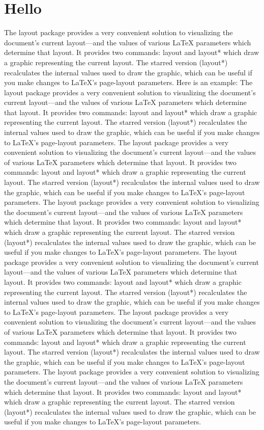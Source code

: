 \documentclass{bduMasters}
\begin{document}
\section{Hello}
The layout package provides a very convenient solution to visualizing the document's current layout—and the values of various LaTeX parameters which determine that layout. It provides two commands: layout and layout* which draw a graphic representing the current layout. The starred version (layout*) recalculates the internal values used to draw the graphic, which can be useful if you make changes to LaTeX's page-layout parameters. Here is an example:
The layout package provides a very convenient solution to visualizing the document's current layout—and the values of various LaTeX parameters which determine that layout. It provides two commands: layout and layout* which draw a graphic representing the current layout. The starred version (layout*) recalculates the internal values used to draw the graphic, which can be useful if you make changes to LaTeX's page-layout parameters.
The layout package provides a very convenient solution to visualizing the document's current layout—and the values of various LaTeX parameters which determine that layout. It provides two commands: layout and layout* which draw a graphic representing the current layout. The starred version (layout*) recalculates the internal values used to draw the graphic, which can be useful if you make changes to LaTeX's page-layout parameters.
The layout package provides a very convenient solution to visualizing the document's current layout—and the values of various LaTeX parameters which determine that layout. It provides two commands: layout and layout* which draw a graphic representing the current layout. The starred version (layout*) recalculates the internal values used to draw the graphic, which can be useful if you make changes to LaTeX's page-layout parameters.
The layout package provides a very convenient solution to visualizing the document's current layout—and the values of various LaTeX parameters which determine that layout. It provides two commands: layout and layout* which draw a graphic representing the current layout. The starred version (layout*) recalculates the internal values used to draw the graphic, which can be useful if you make changes to LaTeX's page-layout parameters.
The layout package provides a very convenient solution to visualizing the document's current layout—and the values of various LaTeX parameters which determine that layout. It provides two commands: layout and layout* which draw a graphic representing the current layout. The starred version (layout*) recalculates the internal values used to draw the graphic, which can be useful if you make changes to LaTeX's page-layout parameters.
The layout package provides a very convenient solution to visualizing the document's current layout—and the values of various LaTeX parameters which determine that layout. It provides two commands: layout and layout* which draw a graphic representing the current layout. The starred version (layout*) recalculates the internal values used to draw the graphic, which can be useful if you make changes to LaTeX's page-layout parameters.
\end{document}
